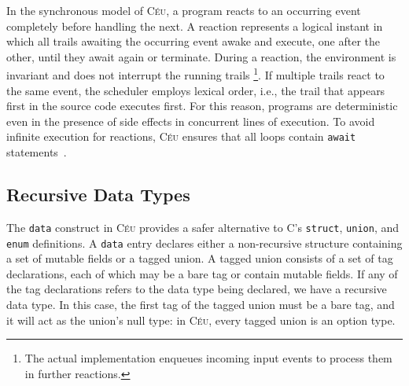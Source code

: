 \documentclass{acm_proc_article-sp}
\newcommand{\CEU}{\textsc{C\'{e}u}\xspace}
\newcommand{\code}[1] {{\small{\texttt{#1}}}}
\begin{document}
In the synchronous model of \CEU, a program reacts to an occurring event 
completely before handling the next.
%
A reaction represents a logical instant in which all trails awaiting the 
occurring event awake and execute, one after the other, until they await again 
or terminate.
%
During a reaction, the environment is invariant and does not interrupt the 
running trails%
\footnote{
The actual implementation enqueues incoming input events to process them in 
further reactions.
}.
If multiple trails react to the same event, the scheduler employs lexical 
order, i.e., the trail that appears first in the source code executes first.
%
For this reason, programs are deterministic even in the presence of side 
effects in concurrent lines of execution.
%
To avoid infinite execution for reactions, \CEU ensures that all loops contain 
\code{await} statements~\cite{ceu.sensys13}.

\subsection{Recursive Data Types}

The \code{data} construct in \CEU provides a safer alternative to C's
\code{struct}, \code{union}, and \code{enum} definitions. A \code{data} entry
declares either a non-recursive structure containing a set of mutable fields
or a tagged union. A tagged union consists of a set of tag declarations, each
of which may be a bare tag or contain mutable fields. If any of the tag
declarations refers to the data type being declared, we have a recursive data
type. In this case, the first tag of the tagged union must be a bare tag, and
it will act as the union's null type: in \CEU, every tagged union is an option
type.

%
%
%
%
%
\end{document}
